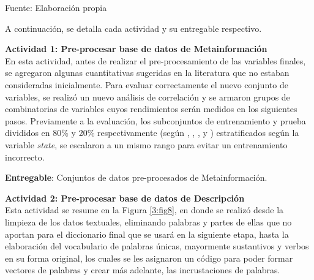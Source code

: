 \begin{flushleft}	%
	\small Fuente: Elaboración propia
\end{flushleft}

A continuación, se detalla cada actividad y su entregable respectivo.

\textbf{Actividad 1: Pre-procesar base de datos de Metainformación}
\\
En esta actividad, antes de realizar el pre-procesamiento de las variables finales, se agregaron algunas cuantitativas sugeridas en la literatura que no estaban consideradas inicialmente. Para evaluar correctamente el nuevo conjunto de variables, se realizó un nuevo análisis de correlación y se armaron grupos de combinatorias de variables cuyos rendimientos serán medidos en los siguientes pasos. Previamente a la evaluación, los subconjuntos de entrenamiento y prueba divididos en 80\% y 20\% respectivamente (según \cite{pr_yuan2016textanalytics}, \cite{pr_yu2018deeplearning}, \cite{pr_chen2019keywords_crowdfunding}, \cite{pr_mitra2014phrases} y \cite{pr_sawhney2016usingLT}) estratificados según la variable \textit{state}, se escalaron a un mismo rango para evitar un entrenamiento incorrecto.

\textbf{Entregable}: Conjuntos de datos pre-procesados de Metainformación.

\textbf{Actividad 2: Pre-procesar base de datos de Descripción}
\\
Esta actividad se resume en la Figura \ref{3:fig8}, en donde se realizó desde la limpieza de los datos textuales, eliminando palabras y partes de ellas que no aportan para el diccionario final que se usará en la siguiente etapa, hasta la elaboración del vocabulario de palabras únicas, mayormente sustantivos y verbos en su forma original, los cuales se les asignaron un código para poder formar vectores de palabras y crear más adelante, las incrustaciones de palabras.

